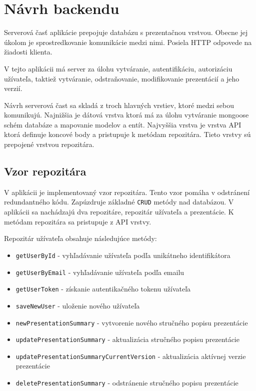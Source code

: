 \section{Návrh backendu}
Serverová časť aplikácie prepojuje databázu s prezentačnou vrstvou. Obecne jej úkolom je sprostredkovanie komunikácie medzi nimi. Posiela HTTP odpovede na žiadosti klienta.

V tejto aplikácii má server za úlohu vytváranie, autentifikáciu, autorizáciu užívateľa, taktiež vytváranie, odstraňovanie, modifikovanie prezentácií a jeho verzií.

Návrh serverová čast sa skladá z troch hlavných vrstiev, ktoré medzi sebou komunikujú. Najnižšia je dátová vrstva ktorá má za úlohu vytváranie mongoose schém databáze a mapovanie modelov a entít. Najvyššia vrstva je vrstva API ktorá definuje koncové body a pristupuje k metódam repozitára. Tieto vrstvy sú prepojené vrstvou repozitára.

\subsection*{Vzor repozitára}
V aplikácii je implementovaný vzor repozitára. Tento vzor pomáha v odstránení redundantného kódu. Zapúzdruje základné \texttt{CRUD} metódy nad databázou. V aplikácii sa nachádzajú dva repozitáre, repozitár užívateľa a prezentácie. K metódam repozitára sa pristupuje z API vrstvy. 

\vspace{5mm}
\vspace{5mm}

Repozitár užívateľa obsahuje následujúce metódy:
    \begin{itemize}
        \item\texttt{getUserById} - vyhľadávanie užívateľa podľa unikátneho identifikátora
        \item\texttt{getUserByEmail} - vyhľadávanie užívateľa podľa emailu
        \item\texttt{getUserToken} - získanie autentikačného tokenu užívateľa
        \item\texttt{saveNewUser} - uloženie nového užívateľa
        \item\texttt{newPresentationSummary} - vytvorenie nového stručného popisu prezentácie
        \item\texttt{updatePresentationSummary} - aktualizácia stručného popisu prezentácie
        \item\texttt{updatePresentationSummaryCurrentVersion} - aktualizácia aktívnej verzie prezentácie
        \item\texttt{deletePresentationSummary} - odstránenie stručného popisu prezentácie
    \end{itemize}
    
